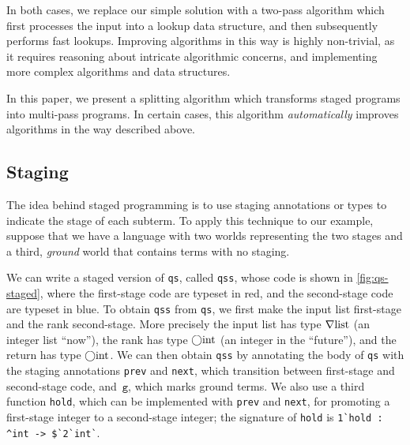 \begin{abstrsyn}
In both cases, we replace our simple solution with a two-pass algorithm which
first processes the input into a lookup data structure, and then subsequently
performs fast lookups. Improving algorithms in this way is highly non-trivial,
as it requires reasoning about intricate algorithmic concerns, and implementing
more complex algorithms and data structures.  

In this paper, we present a splitting algorithm which transforms staged programs
into multi-pass programs. In certain cases, this algorithm \emph{automatically}
improves algorithms in the way described above.


\subsection{Staging}


The idea behind staged programming is to use staging annotations or
types to indicate the stage of each subterm.  To apply this
technique to our example, suppose that we have a language with two
worlds representing the two stages and a third, {\em ground} world
that contains terms with no staging.

We can write a staged version of \texttt{qs}, called \texttt{qss},
whose code is shown in \ref{fig:qs-staged}, where the first-stage code
are typeset in red, and the second-stage code are typeset in blue.  To
obtain \texttt{qss} from \texttt{qs}, we first make the input list 
first-stage and the rank second-stage.
%
More precisely the input list has type $\nabla\mathrm{list}$ (an
integer list ``now''), the rank has type $\bigcirc{\rm int}$ (an integer in
the ``future''), and the return has type $\bigcirc{\rm int}$.
%
We can then obtain \texttt{qss} by annotating the body of \texttt{qs}
with the staging annotations \texttt{prev} and \texttt{next}, which
transition between first-stage and second-stage code, and~$\texttt{g}$, 
which marks ground terms.  
%
We also use a third function
\texttt{hold}, which can be implemented with \texttt{prev} and
\texttt{next}, for promoting a first-stage integer to a second-stage integer;
the signature of \texttt{hold} is
% 
\lstinline{1`hold : ^int -> $`2`int`}.


\end{abstrsyn}
